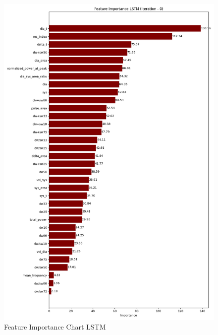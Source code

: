 \begin{figure}[h]
    \centering
    \vspace{-1cm}
    \hspace{-2cm}
    \includegraphics[width=\textwidth]{images/results/feature_importance/feature_importance_plot_LSTM_0}
    \caption{Feature Importance Chart LSTM}
    \label{fig:fi_lstm}
\end{figure}

